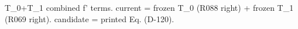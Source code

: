 T_0+T_1 combined f' terms.
current = frozen T_0 (R088 right) + frozen T_1 (R069 right).
candidate = printed Eq. (D-120).
